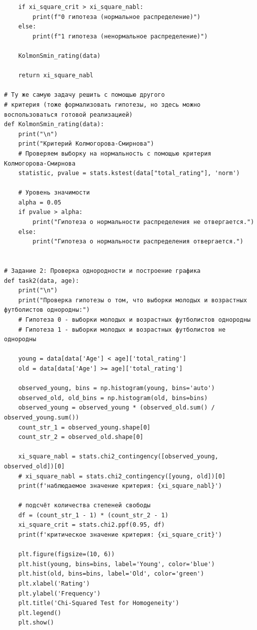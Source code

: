 \documentclass{article}
\begin{document}
\begin{verbatim}
    if xi_square_crit > xi_square_nabl:
        print(f"0 гипотеза (нормальное распределение)")
    else:
        print(f"1 гипотеза (ненормальное распределение)")

    KolmonSmin_rating(data)

    return xi_square_nabl

# Ту же самую задачу решить с помощью другого
# критерия (тоже формализовать гипотезы, но здесь можно воспользоваться готовой реализацией)
def KolmonSmin_rating(data):
    print("\n")
    print("Критерий Колмогорова-Смирнова")
    # Проверяем выборку на нормальность c помощью критерия Колмогорова-Смирнова
    statistic, pvalue = stats.kstest(data["total_rating"], 'norm')

    # Уровень значимости
    alpha = 0.05
    if pvalue > alpha:
        print("Гипотеза о нормальности распределения не отвергается.")
    else:
        print("Гипотеза о нормальности распределения отвергается.")


# Задание 2: Проверка однородности и построение графика
def task2(data, age):
    print("\n")
    print("Проверка гипотезы о том, что выборки молодых и возрастных футболистов однородны:")
    # Гипотеза 0 - выборки молодых и возрастных футболистов однородны
    # Гипотеза 1 - выборки молодых и возрастных футболистов не однородны

    young = data[data['Age'] < age]['total_rating']
    old = data[data['Age'] >= age]['total_rating']

    observed_young, bins = np.histogram(young, bins='auto')
    observed_old, old_bins = np.histogram(old, bins=bins)
    observed_young = observed_young * (observed_old.sum() / observed_young.sum())
    count_str_1 = observed_young.shape[0]
    count_str_2 = observed_old.shape[0]

    xi_square_nabl = stats.chi2_contingency([observed_young, observed_old])[0]
    # xi_square_nabl = stats.chi2_contingency([young, old])[0]
    print(f'наблюдаемое значение критерия: {xi_square_nabl}')

    # подсчёт количества степеней свободы
    df = (count_str_1 - 1) * (count_str_2 - 1)
    xi_square_crit = stats.chi2.ppf(0.95, df)
    print(f'критическое значение критерия: {xi_square_crit}')

    plt.figure(figsize=(10, 6))
    plt.hist(young, bins=bins, label='Young', color='blue')
    plt.hist(old, bins=bins, label='Old', color='green')
    plt.xlabel('Rating')
    plt.ylabel('Frequency')
    plt.title('Chi-Squared Test for Homogeneity')
    plt.legend()
    plt.show()


\end{verbatim}
\end{document}
